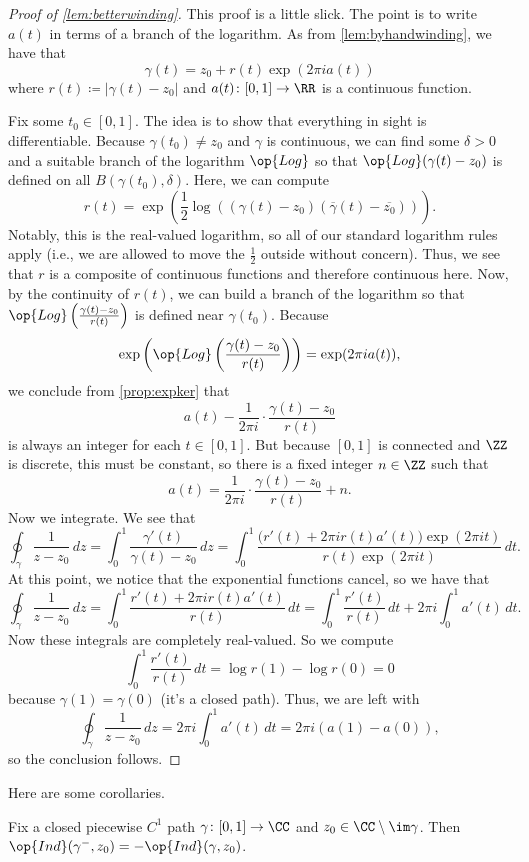 \documentclass[../notes.tex]{subfiles}
\begin{document}
\begin{proof}[Proof of \autoref{lem:betterwinding}]
	This proof is a little slick. The point is to write $a(t)$ in terms of a branch of the logarithm. As from \autoref{lem:byhandwinding}, we have that
	\[\gamma(t)=z_0+r(t)\exp(2\pi ia(t))\]
	where $r(t)\coloneqq |\gamma(t)-z_0|$ and $a(t)\colon [0,1]\to\RR$ is a continuous function.

	Fix some $t_0\in[0,1]$. The idea is to show that everything in sight is differentiable. Because $\gamma(t_0)\ne z_0$ and $\gamma$ is continuous, we can find some $\delta>0$ and a suitable branch of the logarithm $\op{Log}$ so that $\op{Log}(\gamma(t)-z_0)$ is defined on all $B(\gamma(t_0),\delta)$. Here, we can compute
	\[r(t)=\exp\left(\frac12\log\left((\gamma(t)-z_0)(\overline\gamma(t)-\overline{z_0})\right)\right).\]
	Notably, this is the real-valued logarithm, so all of our standard logarithm rules apply (i.e., we are allowed to move the $\frac12$ outside without concern). Thus, we see that $r$ is a composite of continuous functions and therefore continuous here. Now, by the continuity of $r(t)$, we can build a branch of the logarithm so that $\op{Log}\left(\frac{\gamma(t)-z_0}{r(t)}\right)$ is defined near $\gamma(t_0)$. Because
	\[\exp\left(\op{Log}\left(\frac{\gamma(t)-z_0}{r(t)}\right)\right)=\exp(2\pi ia(t)),\]
	we conclude from \autoref{prop:expker} that
	\[a(t)-\frac1{2\pi i}\cdot\frac{\gamma(t)-z_0}{r(t)}\]
	is always an integer for each $t\in[0,1]$. But because $[0,1]$ is connected and $\ZZ$ is discrete, this must be constant, so there is a fixed integer $n\in\ZZ$ such that
	\[a(t)=\frac1{2\pi i}\cdot\frac{\gamma(t)-z_0}{r(t)}+n.\]
	Now we integrate. We see that
	\[\oint_\gamma\frac1{z-z_0}\,dz=\int_0^1\frac{\gamma'(t)}{\gamma(t)-z_0}\,dz=\int_0^1\frac{\big(r'(t)+2\pi ir(t)a'(t)\big)\exp(2\pi it)}{r(t)\exp(2\pi it)}\,dt.\]
	At this point, we notice that the exponential functions cancel, so we have that
	\[\oint_\gamma\frac1{z-z_0}\,dz=\int_0^1\frac{r'(t)+2\pi ir(t)a'(t)}{r(t)}\,dt=\int_0^1\frac{r'(t)}{r(t)}\,dt+2\pi i\int_0^1a'(t)\,dt.\]
	Now these integrals are completely real-valued. So we compute
	\[\int_0^1\frac{r'(t)}{r(t)}\,dt=\log r(1)-\log r(0)=0\]
	because $\gamma(1)=\gamma(0)$ (it's a closed path). Thus, we are left with
	\[\oint_\gamma\frac1{z-z_0}\,dz=2\pi i\int_0^1a'(t)\,dt=2\pi i(a(1)-a(0)),\]
	so the conclusion follows.
\end{proof}
Here are some corollaries.
\begin{corollary}
	Fix a closed piecewise $C^1$ path $\gamma\colon [0,1]\to\CC$ and $z_0\in\CC\setminus\im\gamma$. Then $\op{Ind}(\gamma^-,z_0)=-\op{Ind}(\gamma,z_0)$.
\end{corollary}
\end{document}
